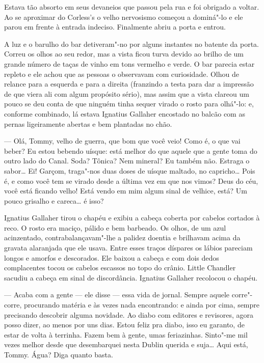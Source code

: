 Estava tão absorto em seus devaneios que passou pela rua e foi obrigado a
voltar.  Ao se aproximar do Corless’s o velho nervosismo começou a dominá"-lo e
ele parou em frente à entrada indeciso.  Finalmente abriu a porta e entrou.

A luz e o barulho do bar detiveram"-no por alguns instantes no batente da porta.
Correu os olhos ao seu redor, mas a vista ficou turva devido ao brilho de um
grande número de taças de vinho em tons vermelho e verde.  O bar parecia estar
repleto e ele achou que as pessoas o observavam com curiosidade.  Olhou de
relance para a esquerda e para a direita (franzindo a testa para dar a
impressão de que viera ali com algum propósito sério), mas assim que a vista
clareou um pouco se deu conta de que ninguém tinha sequer virado o rosto para
olhá"-lo: e, conforme combinado, lá estava Ignatius Gallaher encostado no balcão
com as pernas ligeiramente abertas e bem plantadas no chão.

--- Olá, Tommy, velho de guerra, que bom que você veio!  Como é, o que vai
beber? Eu estou bebendo uísque: está melhor do que aquele que a gente toma do
outro lado do Canal.  Soda?  Tônica?  Nem mineral?  Eu também não.  Estraga o
sabor\ldots{} Ei!  Garçom, traga"-nos duas doses de uísque maltado, no
capricho\ldots{}  Pois é, e como você tem se virado desde a última vez em que
nos vimos?  Deus do céu, você está ficando velho!  Está vendo em mim algum
sinal de velhice, está?  Um pouco grisalho e careca\ldots{} é isso?

Ignatius Gallaher tirou o chapéu e exibiu a cabeça coberta por cabelos cortados
à reco.  O rosto era maciço, pálido e bem barbeado.  Os olhos, de um
azul acinzentado, contrabalançavam"-lhe a palidez doentia e brilhavam acima da
gravata alaranjada que ele usava.  Entre esses traços díspares os lábios
pareciam longos e amorfos e descorados.  Ele baixou a cabeça e com dois dedos
complacentes tocou os cabelos escassos no topo do crânio.  Little Chandler
sacudiu a cabeça em sinal de discordância.  Ignatius Gallaher recolocou o
chapéu.

--- Acaba com a gente --- ele disse --- essa vida de jornal.  Sempre aquele
corre"-corre, procurando matéria e às vezes nada encontrando: e ainda por cima,
sempre precisando descobrir alguma novidade.  Ao diabo com editores e
revisores, agora posso dizer, ao menos por uns dias.  Estou feliz pra diabo,
isso eu garanto, de estar de volta à terrinha.  Fazem bem à gente, umas
feriazinhas.  Sinto"-me mil vezes melhor desde que desembarquei nesta Dublin
querida e suja\ldots{}  Aqui está, Tommy.  Água?  Diga quanto basta.

